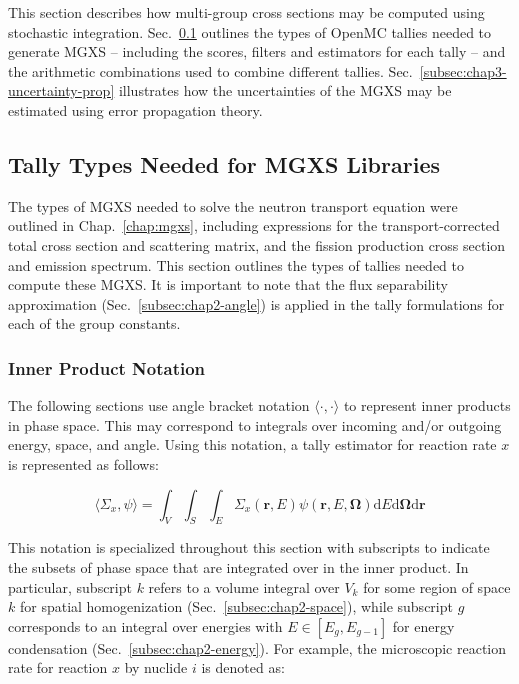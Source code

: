 This section describes how multi-group cross sections may be computed using stochastic integration. Sec.~\ref{subsec:chap3-tally-types} outlines the types of OpenMC tallies needed to generate \ac{MGXS} -- including the scores, filters and estimators for each tally -- and the arithmetic combinations used to combine different tallies. Sec.~\ref{subsec:chap3-uncertainty-prop} illustrates how the uncertainties of the \ac{MGXS} may be estimated using error propagation theory.


\subsection{Tally Types Needed for \ac{MGXS} Libraries}
\label{subsec:chap3-tally-types}

The types of \ac{MGXS} needed to solve the neutron transport equation were outlined in Chap.~\ref{chap:mgxs}, including expressions for the transport-corrected total cross section and scattering matrix, and the fission production cross section and emission spectrum. This section outlines the types of tallies needed to compute these \ac{MGXS}. It is important to note that the flux separability approximation (Sec.~\ref{subsec:chap2-angle}) is applied in the tally formulations for each of the group constants.

\subsubsection{Inner Product Notation}
\label{subsec:chap3-tally-types-notation}

The following sections use angle bracket notation $\langle \cdot , \cdot \rangle$ to represent inner products in phase space. This may correspond to integrals over incoming and/or outgoing energy, space, and angle. Using this notation, a tally estimator for reaction rate $x$ is represented as follows: 

\begin{equation}
\label{eqn:chap3-inner-prod-notation}
\langle \Sigma_x, \psi \rangle = \int_{V} \int_{S} \int_{E} \Sigma_{x}(\mathbf{r},E)\psi(\mathbf{r},E,\mathbf{\Omega}) \mathrm{d}E\mathrm{d}\mathbf{\Omega}\mathrm{d}\mathbf{r}
\end{equation}

\noindent This notation is specialized throughout this section with subscripts to indicate the subsets of phase space that are integrated over in the inner product. In particular, subscript $k$ refers to a volume integral over $V_{k}$ for some region of space $k$ for spatial homogenization (Sec.~\ref{subsec:chap2-space}), while subscript $g$ corresponds to an integral over energies with $E \in [E_{g}, E_{g-1}]$ for energy condensation (Sec.~\ref{subsec:chap2-energy}). For example, the microscopic reaction rate for reaction $x$ by nuclide $i$ is denoted as:

